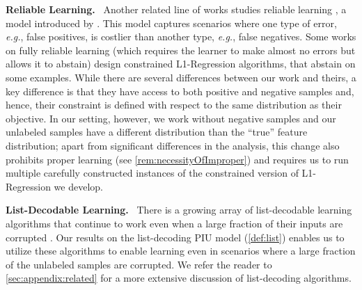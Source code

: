 \documentclass[11pt]{article}
\theoremstyle{plain}
\theoremstyle{definition}
\theoremstyle{remark}
\renewcommand{\paragraph}[1]{\medskip \noindent\textbf{#1}~}
\newcommand{\eg}{\textit{e.g.}}
\newcommand{\lreg}{\textsf{L1-Regression}}
\begin{document}
         
    
        \paragraph{Reliable Learning.} 
            Another related line of works studies reliable learning \cite{kalai2012reliable,kalai2021arbitraryCS,kanade2014independentRealiable,goel2017reliableRELU,durgin2019reliableCSPs,goldwasser2020beyondPurturbations,diakonikolas2024reliable}, a model introduced by \citet{kalai2012reliable}.
            This model captures scenarios where one type of error, \eg{}, false positives, is costlier than another type, \eg{}, false negatives. 
            Some works \cite{kalai2012reliable,kanade2014independentRealiable} on fully reliable learning (which requires the learner to make almost no errors but allows it to abstain) design constrained \lreg{} algorithms, that abstain on some examples. 
            While there are several differences between our work and theirs, a key difference is that they have access to both positive and negative samples and, hence, their constraint is defined with respect to the same distribution as their objective. 
            In our setting, however, we work without negative samples and our unlabeled samples have a different distribution than the ``true'' feature distribution; apart from significant differences in the analysis, this change also prohibits proper learning (see \cref{rem:necessityOfImproper}) and requires us to run multiple carefully constructed instances of the constrained version of \lreg{} we develop.


        \paragraph{List-Decodable Learning.}
            There is a growing array of list-decodable learning algorithms that continue to work even when a large fraction of their inputs are corrupted \cite{charikar2017learning,karmalkar2019list,Cherapanamjeri2020DecodableNearlyLinear,bakshi2021Subspace,Abhimanyu2023DecodableBatches,Diakonikolas2023DecodableCovariance,kothari2022decodableCovariance,Raghavendra2020Decoding,Diakonikolas2022DecodableSparseMean,Diakonikolas2021SQ_LB_Decoding,Diakonikolas2021PCA_Decodable}.
            Our results on the list-decoding PIU model (\cref{def:list}) enables us to utilize these algorithms to enable learning even in scenarios where a large fraction of the unlabeled samples are corrupted.
            We refer the reader to \cref{sec:appendix:related} for a more extensive discussion of list-decoding algorithms.
            
\end{document}
